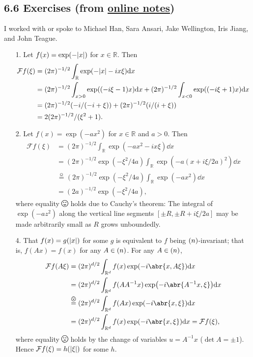 \documentclass[11pt,leqno]{article}
\theoremstyle{plain}
\theoremstyle{definition}
\numberwithin{equation}{section}
\numberwithin{lem}{section}
\newcommand{\eq}[1]{\overset{#1}{=}}
\let\O\relax
\newcommand{\O}{\mathrm O}
\newcommand{\smallhappy}{\smiley}
\newcommand{\happy}{\raisebox{-.14em}{\resizebox{1.2em}{!}{\smiley}}}
\newcommand{\smallsad}{\frownie}
\newcommand{\sad}{\raisebox{-.14em}{\resizebox{1.2em}{!}{\frownie}}}
\DeclareMathOperator{\mathhappy}{\!\happy\!}
\DeclareMathOperator{\smallmathhappy}{\!\smallhappy\!}
\DeclareMathOperator{\mathsad}{\!\sad\!}
\DeclareMathOperator{\smallmathsad}{\!\smallsad\!}
\begin{document}
\subsection*{6.6 Exercises (from \href{https://users.oden.utexas.edu/~arbogast/appMath08c.pdf}{online notes})}
I worked with or spoke to Michael Han, Sara Ansari, Jake Wellington, Iris Jiang, and John Teague.
\begin{enumerate}
    \item[1.] Let $f(x) = \exp(-\abs{x})$ for $x\in\mathbb R$. Then \begin{align*}
      \mathcal Ff(\xi) &= (2\pi)^{-1/2}\int_{\mathbb R} \exp(-\abs{x} - ix\xi)\dd x\\
      &= (2\pi)^{-1/2}\int_{x>0} \exp((-i\xi-1)x)\dd x + (2\pi)^{-1/2}\int_{x<0} \exp((-i\xi+1)x)\dd x\\
      &= (2\pi)^{-1/2}(-i/(-i + \xi)) + (2\pi)^{-1/2}(i/(i + \xi))\\
      &= 2(2\pi)^{-1/2}/(\xi^2+1).
    \end{align*}
    \item[2.] Let $f(x) = \exp(-ax^2)$ for $x\in\mathbb R$ and $a>0$. Then \begin{align*}
      \mathcal Ff(\xi) &= (2\pi)^{-1/2}\int_{\mathbb R} \exp(-ax^2-ix\xi)\dd x\\
      &= (2\pi)^{-1/2}\exp(-\xi^2/4a)\int_{\mathbb R} \exp(- a (x +i\xi/2a)^2)\dd x\\
      &\eq{\smallmathhappy} (2\pi)^{-1/2}\exp(-\xi^2/4a)\int_{\mathbb R} \exp(- ax^2)\dd x\\
      &= (2a)^{-1/2}\exp(-\xi^2/4a),
    \end{align*}
    where equality $\mathhappy$ holds due to Cauchy's theorem: The integral of $\exp(- az^2)$ along the vertical line segments $[\pm R,\pm R + i\xi/2a]$ may be made arbitrarily small as $R$ grows unboundedly.
    \item[4.] That $f(x) = g(\abs{x})$ for some $g$ is equivalent to $f$ being $\O(n)$-invariant; that is, $f(Ax) = f(x)$ for any $A\in \O(n)$. For any $A\in \O(n)$, \begin{align*}
      \mathcal Ff(A\xi) &= (2\pi)^{d/2}\int_{\mathbb R^d} f(x)\exp(-i\abr{x,A\xi})\dd x \\
      &= (2\pi)^{d/2}\int_{\mathbb R^d} f(AA^{-1}x)\exp(-i\abr{A^{-1}x,\xi})\dd x \\
      &\eq{\smallmathsad} (2\pi)^{d/2}\int_{\mathbb R^d} f(Ax)\exp(-i\abr{x,\xi})\dd x\\
      &= (2\pi)^{d/2}\int_{\mathbb R^d} f(x)\exp(-i\abr{x,\xi})\dd x = \mathcal Ff(\xi), 
    \end{align*}
    where equality $\mathsad$ holds by the change of variables $u = A^{-1}x$ ($\det A = \pm 1$). Hence $\mathcal Ff(\xi) = h(\abs{\xi})$ for some $h$. 


\end{enumerate}
\end{document}
